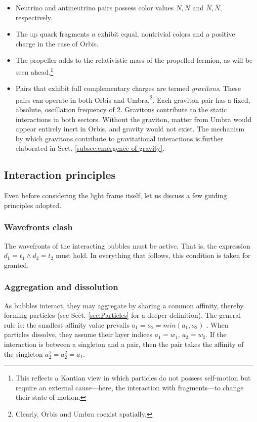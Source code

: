 \documentclass[12pt]{article}
\begin{document}
\begin{itemize}
    \item Neutrino and antineutrino pairs possess color values $N, N$ and $\bar{N}, \bar{N}$, respectively.

    \item The up quark fragments $u$ exhibit equal, nontrivial colors and a positive charge in the case of Orbis. 

    \item The propeller adds to the relativistic mass of the propelled fermion, as will be seen ahead.\footnote{This reflects a Kantian view in which particles do not possess self-motion but require an external cause—here, the interaction with fragments—to change their state of motion.}

    \item Pairs that exhibit full complementary charges are termed \emph{gravitons}. These pairs can operate in both Orbis and Umbra.\footnote{Clearly, Orbis and Umbra coexist spatially.}. Each graviton pair has a fixed, absolute, oscillation frequency of $2$. Gravitons contribute to the static interactions in both sectors. Without the graviton, matter from Umbra would appear entirely inert in Orbis, and gravity would not exist. The mechanism by which gravitons contribute to gravitational interactions is further elaborated in Sect. \ref{subsec:emergence-of-gravity}.
\end{itemize}

\subsection{Interaction principles}
Even before considering the light frame itself, let us discuss a few guiding principles adopted.

\subsubsection{Wavefronts clash}
The wavefronts of the interacting bubbles must be active. That is, the expression $d_1 = t_1 \wedge d_2 = t_2$ must hold. In everything that follows, this condition is taken for granted.

\subsubsection{Aggregation and dissolution}\label{subsec-role-of-affinity}

As bubbles interact, they may aggregate by sharing a common affinity, thereby forming particles (see Sect. \ref{sec:Particles} for a deeper definition). The general rule is: the smallest affinity value prevails $a_1=a_2=min(a_1,a_2)$ . When particles dissolve, they assume their layer indices $a_1 = w_1, \, a_2 = w_2$. If the interaction is between a singleton and a pair, then the pair takes the affinity of the singleton $a_2^1=a_2^2=a_1$.
\end{document}
